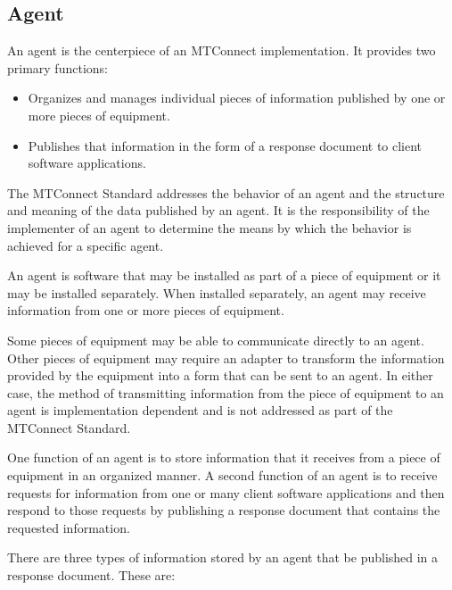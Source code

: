 \documentclass{mtconnect}	%
\begin{document}
\subsection{Agent}

An \gls{agent} is the centerpiece of an MTConnect implementation.  It provides two primary functions:

\begin{itemize}

\item Organizes and manages individual pieces of information published by one or more pieces of equipment.

\item Publishes that information in the form of a \gls{response document} to client software applications.

\end{itemize}

The MTConnect Standard addresses the behavior of an \gls{agent} and the structure and meaning of the data published by an \gls{agent}.  It is the responsibility of the implementer of an \gls{agent} to determine the means by which the behavior is achieved for a specific \gls{agent}.

An \gls{agent} is software that may be installed as part of a piece of equipment or it may be installed separately.  When installed separately, an \gls{agent} may receive information from one or more pieces of equipment.

Some pieces of equipment may be able to communicate directly to an \gls{agent}.  Other pieces of equipment may require an \gls{adapter} to transform the information provided by the equipment into a form that can be sent to an \gls{agent}.  In either case, the method of transmitting information from the piece of equipment to an \gls{agent} is implementation dependent and is not addressed as part of the MTConnect Standard.

One function of an \gls{agent} is to store information that it receives from a piece of equipment in an organized manner.  A second function of an \gls{agent} is to receive \glspl{request} for information from one or many client software applications and then respond to those \glspl{request} by publishing a \gls{response document} that contains the requested information.

There are three types of information stored by an \gls{agent} that \MAY be published in a \gls{response document}.  These are:
\end{document}
